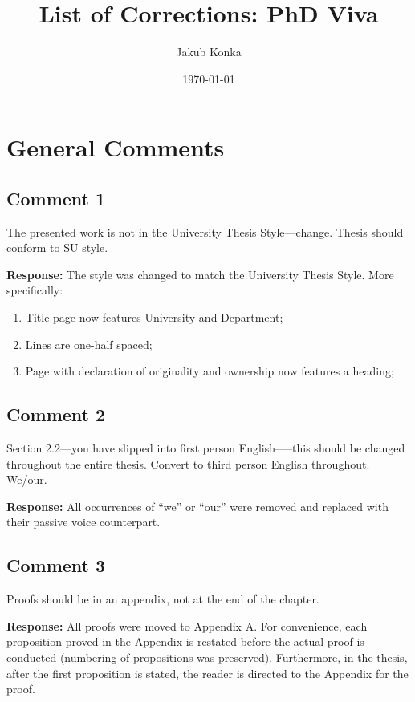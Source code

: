 \documentclass[10pt,a4paper,notitlepage]{article}
\numberwithin{equation}{section}
\begin{document}
\title{List of Corrections: PhD Viva}
\date{\today}
\author{Jakub Konka}

\maketitle

\setcounter{section}{0}
\renewcommand{\thesection}{G}
\renewcommand{\thesubsection}{G\arabic{subsection}}
\section{General Comments}

\setcounter{subsection}{0}
\subsection{Comment 1}
The presented work is not in the University Thesis Style---change. Thesis should conform to SU style.

\textbf{Response:}
The style was changed to match the University Thesis Style. More specifically:
\begin{enumerate}
	\item Title page now features University and Department;
	\item Lines are one-half spaced;
	\item Page with declaration of originality and ownership now features a heading;
\end{enumerate}

\subsection{Comment 2}
Section 2.2---you have slipped into first person English–––this should be changed throughout the entire thesis. Convert to third person English throughout. We/our.

\textbf{Response:}
All occurrences of ``we'' or ``our'' were removed and replaced with their passive voice counterpart.

\subsection{Comment 3}
Proofs should be in an appendix, not at the end of the chapter.

\textbf{Response:}
All proofs were moved to Appendix A. For convenience, each proposition proved in the Appendix is restated before the actual proof is conducted (numbering of propositions was preserved). Furthermore, in the thesis, after the first proposition is stated, the reader is directed to the Appendix for the proof.
\end{document}
